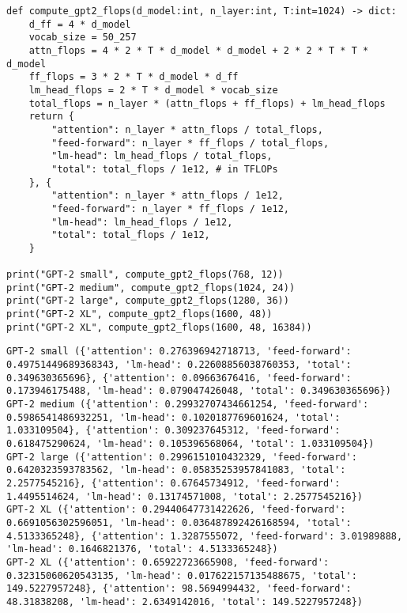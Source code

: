 \begin{lstlisting}
def compute_gpt2_flops(d_model:int, n_layer:int, T:int=1024) -> dict:
    d_ff = 4 * d_model
    vocab_size = 50_257
    attn_flops = 4 * 2 * T * d_model * d_model + 2 * 2 * T * T * d_model
    ff_flops = 3 * 2 * T * d_model * d_ff
    lm_head_flops = 2 * T * d_model * vocab_size
    total_flops = n_layer * (attn_flops + ff_flops) + lm_head_flops
    return {
        "attention": n_layer * attn_flops / total_flops,
        "feed-forward": n_layer * ff_flops / total_flops,
        "lm-head": lm_head_flops / total_flops,
        "total": total_flops / 1e12, # in TFLOPs
    }, {
        "attention": n_layer * attn_flops / 1e12,
        "feed-forward": n_layer * ff_flops / 1e12,
        "lm-head": lm_head_flops / 1e12,
        "total": total_flops / 1e12,
    }

print("GPT-2 small", compute_gpt2_flops(768, 12))
print("GPT-2 medium", compute_gpt2_flops(1024, 24))
print("GPT-2 large", compute_gpt2_flops(1280, 36))
print("GPT-2 XL", compute_gpt2_flops(1600, 48))
print("GPT-2 XL", compute_gpt2_flops(1600, 48, 16384))
\end{lstlisting}

\begin{lstlisting}
GPT-2 small ({'attention': 0.276396942718713, 'feed-forward': 0.49751449689368343, 'lm-head': 0.22608856038760353, 'total': 0.349630365696}, {'attention': 0.09663676416, 'feed-forward': 0.173946175488, 'lm-head': 0.079047426048, 'total': 0.349630365696})
GPT-2 medium ({'attention': 0.29932707434661254, 'feed-forward': 0.5986541486932251, 'lm-head': 0.1020187769601624, 'total': 1.033109504}, {'attention': 0.309237645312, 'feed-forward': 0.618475290624, 'lm-head': 0.105396568064, 'total': 1.033109504})
GPT-2 large ({'attention': 0.2996151010432329, 'feed-forward': 0.6420323593783562, 'lm-head': 0.05835253957841083, 'total': 2.2577545216}, {'attention': 0.67645734912, 'feed-forward': 1.4495514624, 'lm-head': 0.13174571008, 'total': 2.2577545216})
GPT-2 XL ({'attention': 0.29440647731422626, 'feed-forward': 0.6691056302596051, 'lm-head': 0.036487892426168594, 'total': 4.5133365248}, {'attention': 1.3287555072, 'feed-forward': 3.01989888, 'lm-head': 0.1646821376, 'total': 4.5133365248})    
GPT-2 XL ({'attention': 0.65922723665908, 'feed-forward': 0.32315060620543135, 'lm-head': 0.017622157135488675, 'total': 149.5227957248}, {'attention': 98.5694994432, 'feed-forward': 48.31838208, 'lm-head': 2.6349142016, 'total': 149.5227957248})
\end{lstlisting}

